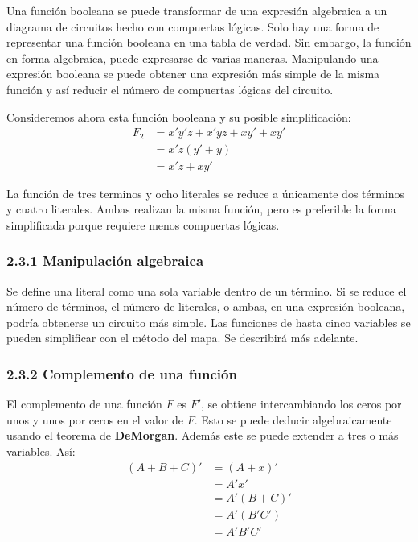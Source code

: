 Una funci\'{o}n booleana se puede transformar de una expresi\'{o}n algebraica a
un diagrama de circuitos hecho con compuertas l\'{o}gicas. Solo hay una forma de
representar una funci\'{o}n booleana en una tabla de verdad. Sin embargo, la
funci\'{o}n en forma algebraica, puede expresarse de varias maneras. Manipulando
una expresi\'{o}n booleana se puede obtener una expresi\'{o}n m\'{a}s simple de
la misma funci\'{o}n y as\'{i} reducir el n\'{u}mero de compuertas l\'{o}gicas
del circuito.

\newpage Consideremos ahora esta funci\'{o}n booleana y su posible
simplificaci\'{o}n: \begin{align*} F_2 & = x'y'z + x'yz + xy' + xy' \\ &= x'z(y'
               + y)                             \\ &= x'z + xy'\end{align*}

La funci\'{o}n de tres terminos y ocho literales se reduce a \'{u}nicamente dos
t\'{e}rminos y cuatro literales. Ambas realizan la misma funci\'{o}n, pero es
preferible la forma simplificada porque requiere menos compuertas l\'{o}gicas.

\subsubsection*{2.3.1 Manipulaci\'{o}n algebraica} Se define una literal como
una sola variable dentro de un t\'{e}rmino. Si se reduce el n\'{u}mero de
t\'{e}rminos, el n\'{u}mero de literales, o ambas, en una expresi\'{o}n booleana,
podr\'{i}a obtenerse un circuito m\'{a}s simple. Las funciones de hasta cinco
variables se pueden simplificar con el m\'{e}todo del mapa. Se describir\'{a}
m\'{a}s adelante.

\subsubsection*{2.3.2 Complemento de una funci\'{o}n} El complemento de una
funci\'{o}n $F$ es $F'$, se obtiene intercambiando los ceros por unos y unos por
ceros en el valor de $F$. Esto se puede deducir algebraicamente usando el
teorema de \textbf{DeMorgan}. Adem\'{a}s este se puede extender a tres o m\'{a}s
variables. As\'{i}: \begin{align*} (A + B + C)' & = (A + x)' \\ &= A'x' \\ &=
               A'(B + C)'                \\ &= A'(B'C') \\ &= A'B'C'\end{align*} \medbreak

